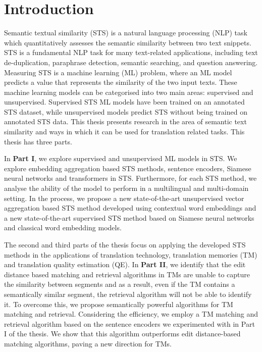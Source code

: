 
\chapter*{Introduction}
\label{cha:introduction}


Semantic textual similarity (STS) is a natural language processing (NLP) task which quantitatively assesses the semantic similarity between two text snippets. STS is a fundamental NLP task for many text-related applications, including text de-duplication, paraphrase detection, semantic searching, and question answering. Measuring STS is a machine learning (ML) problem, where an ML model predicts a value that represents the similarity of the two input texts. These machine learning models can be categorised into two main areas: supervised and unsupervised. Supervised STS ML models have been trained on an annotated STS dataset, while unsupervised models predict STS without being trained on annotated STS data. This thesis presents research in the area of semantic text similarity and ways in which it can be used for translation related tasks. This thesis has three parts.

In \textbf{Part I}, we explore supervised and unsupervised ML models in STS. We explore embedding aggregation based STS methods, sentence encoders, Siamese neural networks and transformers in STS. Furthermore, for each STS method, we analyse the ability of the model to perform in a multilingual and multi-domain setting. In the process, we propose a new state-of-the-art unsupervised vector aggregation based STS method developed using contextual word embeddings and a new state-of-the-art supervised STS method based on Siamese neural networks and classical word embedding models. 

The second and third parts of the thesis focus on applying the developed STS methods in the applications of translation technology, translation memories (TM) and translation quality estimation (QE). In \textbf{Part II}, we identify that the edit distance based matching and retrieval algorithms in TMs are unable to capture the similarity between segments and as a result, even if the TM contains a semantically similar segment, the retrieval algorithm will not be able to identify it. To overcome this, we propose semantically powerful algorithms for TM matching and retrieval. Considering the efficiency, we employ a TM matching and retrieval algorithm based on the sentence encoders we experimented with in Part I of the thesis. We show that this algorithm outperforms edit distance-based matching algorithms, paving a new direction for TMs.

